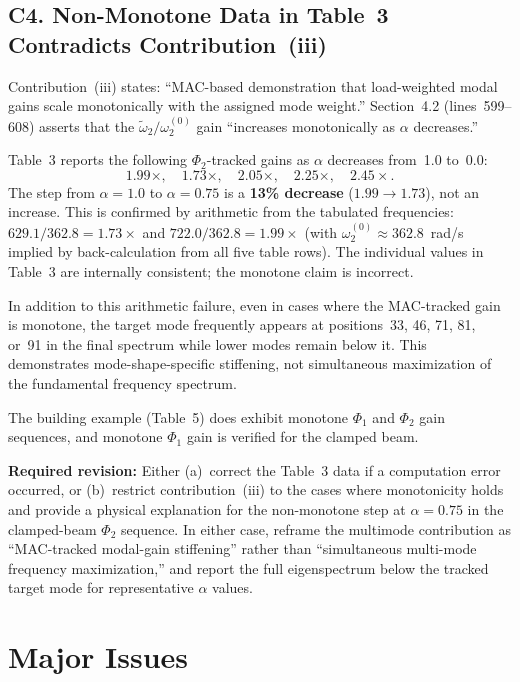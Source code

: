 \documentclass[11pt,a4paper]{article}
\begin{document}
\subsection*{C4.\; Non-Monotone Data in Table~3 Contradicts Contribution~(iii)}

Contribution~(iii) states: ``MAC-based demonstration that load-weighted modal gains scale
monotonically with the assigned mode weight.'' Section~4.2 (lines~599--608) asserts that
the $\widetilde{\omega}_2/\omega_2^{(0)}$ gain ``increases monotonically as $\alpha$
decreases.''

Table~3 reports the following $\Phi_2$-tracked gains as $\alpha$ decreases from~1.0
to~0.0:
\[
  1.99\times,\quad 1.73\times,\quad 2.05\times,\quad 2.25\times,\quad 2.45\times.
\]
The step from $\alpha=1.0$ to $\alpha=0.75$ is a \textbf{13\% decrease}
($1.99\to1.73$), not an increase. This is confirmed by arithmetic from the
tabulated frequencies: $629.1/362.8 = 1.73\times$ and $722.0/362.8 = 1.99\times$
(with $\omega_2^{(0)}\approx362.8$~rad/s implied by back-calculation from all five
table rows). The individual values in Table~3 are internally consistent; the monotone
claim is incorrect.

In addition to this arithmetic failure, even in cases where the MAC-tracked gain is
monotone, the target mode frequently appears at positions~33, 46, 71, 81, or~91 in the
final spectrum while lower modes remain below it. This demonstrates mode-shape-specific
stiffening, not simultaneous maximization of the fundamental frequency spectrum.

The building example (Table~5) does exhibit monotone $\Phi_1$ and $\Phi_2$ gain
sequences, and monotone $\Phi_1$ gain is verified for the clamped beam.

\textbf{Required revision:} Either (a)~correct the Table~3 data if a computation error
occurred, or (b)~restrict contribution~(iii) to the cases where monotonicity holds and
provide a physical explanation for the non-monotone step at $\alpha=0.75$ in the
clamped-beam $\Phi_2$ sequence. In either case, reframe the multimode contribution as
``MAC-tracked modal-gain stiffening'' rather than ``simultaneous multi-mode frequency
maximization,'' and report the full eigenspectrum below the tracked target mode for
representative $\alpha$ values.


\section{Major Issues}
\end{document}
